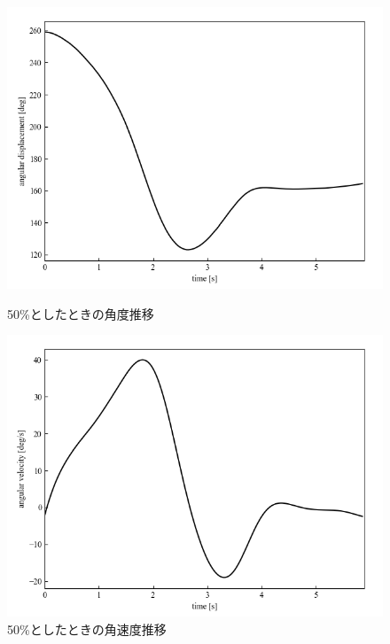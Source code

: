 \begin{figure}[h]
	\centering
	\begin{minipage}{0.43\columnwidth}
	  \centering
	  \includegraphics[width=\columnwidth]{./figure/duty50deg.png}
	  \caption{50\%としたときの角度推移}
	  \label{fig:duty50deg}
	\end{minipage}
	\hspace{5mm}
	\begin{minipage}{0.43\columnwidth}
	  \centering
	  \includegraphics[width=\columnwidth]{./figure/duty50degpers.png}
	  \caption{50\%としたときの角速度推移}
	  \label{fig:duty50degpers}
	\end{minipage}
  \end{figure}

